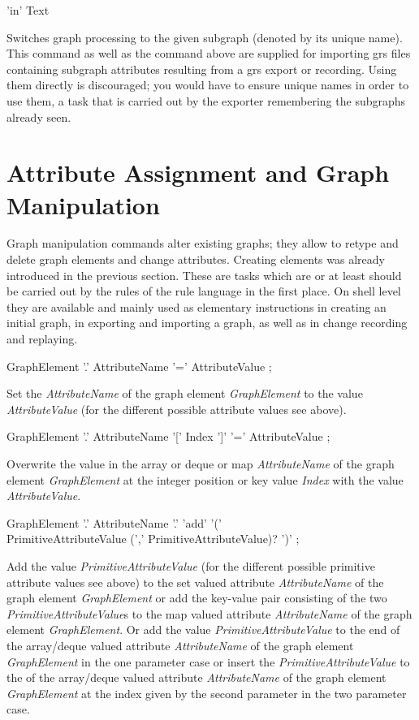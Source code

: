 \begin{rail}
  'in' Text
\end{rail}
Switches graph processing to the given subgraph (denoted by its unique name).
This command as well as the command above are supplied for importing grs files containing subgraph attributes resulting from a grs export or recording.
Using them directly is discouraged; you would have to ensure unique names in order to use them, a task that is carried out by the exporter remembering the subgraphs already seen.


\section{Attribute Assignment and Graph Manipulation}
\label{mani}
Graph manipulation commands alter existing graphs;
they allow to retype and delete graph elements and change attributes.
Creating elements was already introduced in the previous section.
These are tasks which are or at least should be carried out by the rules of the rule language in the first place.
On shell level they are available and mainly used as elementary instructions in creating an initial graph, in exporting and importing a graph, as well as in change recording and replaying.

\begin{rail}
  GraphElement '.' AttributeName '=' AttributeValue ;
\end{rail}
Set the  \emph{AttributeName} of the graph element \emph{GraphElement} to the value \emph{AttributeValue} (for the different possible attribute values see above).

\begin{rail}
  GraphElement '.' AttributeName '[' Index ']' '=' AttributeValue ;
\end{rail}
Overwrite the value in the array or deque or map  \emph{AttributeName} of the graph element \emph{GraphElement} at the integer position or key value \emph{Index} with the value \emph{AttributeValue}.

\begin{rail}
  GraphElement '.' AttributeName '.' 'add' '(' \\
  	PrimitiveAttributeValue (',' PrimitiveAttributeValue)? ')' ;
\end{rail}
Add the value \emph{PrimitiveAttributeValue} (for the different possible primitive attribute values see above) to the set valued attribute \emph{AttributeName} of the graph element \emph{GraphElement} or add the key-value pair consisting of the two \emph{PrimitiveAttributeValue}s to the map valued attribute \emph{AttributeName} of the graph element \emph{GraphElement}.
Or add the value \emph{PrimitiveAttributeValue} to the end of the array/deque valued attribute \emph{AttributeName} of the graph element \emph{GraphElement} in the one parameter case or insert the \emph{PrimitiveAttributeValue} to the of the array/deque valued attribute \emph{AttributeName} of the graph element \emph{GraphElement} at the index given by the second parameter in the two parameter case.


